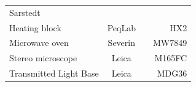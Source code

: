 \documentclass[11pt,singlespacinge,twoside]{reedthesis} %
\begin{document}
\begin{longtable}[]{@{}lccr@{}}
\begin{minipage}[t]{0.10\columnwidth}
Sarstedt\strut
\end{minipage} & \begin{minipage}[t]{0.45\columnwidth}\centering
\strut
\end{minipage} & \begin{minipage}[t]{0.10\columnwidth}\raggedleft
2691\strut
\end{minipage}\tabularnewline
\begin{minipage}[t]{0.25\columnwidth}\raggedright
Heating block\strut
\end{minipage} & \begin{minipage}[t]{0.10\columnwidth}\centering
PeqLab\strut
\end{minipage} & \begin{minipage}[t]{0.45\columnwidth}\centering
\strut
\end{minipage} & \begin{minipage}[t]{0.10\columnwidth}\raggedleft
HX2\strut
\end{minipage}\tabularnewline
\begin{minipage}[t]{0.25\columnwidth}\raggedright
Microwave oven\strut
\end{minipage} & \begin{minipage}[t]{0.10\columnwidth}\centering
Severin\strut
\end{minipage} & \begin{minipage}[t]{0.45\columnwidth}\centering
\strut
\end{minipage} & \begin{minipage}[t]{0.10\columnwidth}\raggedleft
MW7849\strut
\end{minipage}\tabularnewline
\begin{minipage}[t]{0.25\columnwidth}\raggedright
Stereo microscope\strut
\end{minipage} & \begin{minipage}[t]{0.10\columnwidth}\centering
Leica\strut
\end{minipage} & \begin{minipage}[t]{0.45\columnwidth}\centering
\strut
\end{minipage} & \begin{minipage}[t]{0.10\columnwidth}\raggedleft
M165FC\strut
\end{minipage}\tabularnewline
\begin{minipage}[t]{0.25\columnwidth}\raggedright
Transmitted Light Base\strut
\end{minipage} & \begin{minipage}[t]{0.10\columnwidth}\centering
Leica\strut
\end{minipage} & \begin{minipage}[t]{0.45\columnwidth}\centering
\strut
\end{minipage} & \begin{minipage}[t]{0.10\columnwidth}\raggedleft
MDG36\strut
\end{minipage}\tabularnewline
\bottomrule
\end{longtable}
\end{document}
